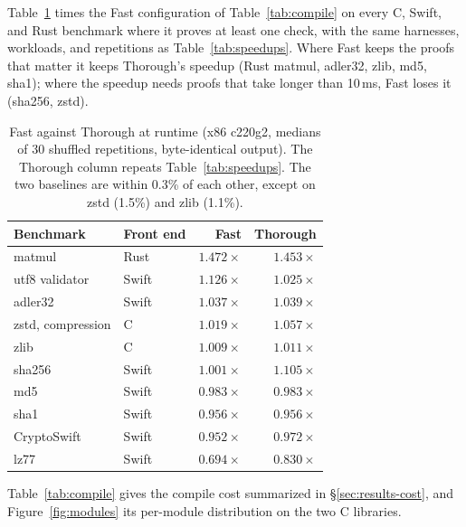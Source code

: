 \documentclass[acmsmall,screen,nonacm]{acmart}
\begin{document}
Table~\ref{tab:fast} times the Fast configuration of
Table~\ref{tab:compile} on every C, Swift, and Rust benchmark where it
proves at least one check, with the same harnesses, workloads, and
repetitions as Table~\ref{tab:speedups}. Where Fast keeps the proofs that
matter it keeps Thorough's speedup (Rust matmul, adler32, zlib, md5, sha1);
where the speedup needs proofs that take longer than 10\,ms, Fast loses it
(sha256, zstd).
\begin{table}[t]
\caption{Fast against Thorough at runtime (x86 c220g2, medians of 30
shuffled repetitions, byte-identical output).
The Thorough column repeats Table~\ref{tab:speedups}. The two baselines
are within 0.3\% of each other, except on zstd (1.5\%) and zlib (1.1\%).}
\label{tab:fast}
\small
\begin{tabular}{llrr}
\toprule
Benchmark & Front end & Fast & Thorough\\
\midrule
matmul & Rust & $1.472\times$ & $1.453\times$\\
utf8 validator & Swift & $1.126\times$ & $1.025\times$\\
adler32 & Swift & $1.037\times$ & $1.039\times$\\
zstd, compression & C & $1.019\times$ & $1.057\times$\\
zlib & C & $1.009\times$ & $1.011\times$\\
sha256 & Swift & $1.001\times$ & $1.105\times$\\
md5 & Swift & $0.983\times$ & $0.983\times$\\
sha1 & Swift & $0.956\times$ & $0.956\times$\\
CryptoSwift & Swift & $0.952\times$ & $0.972\times$\\
lz77 & Swift & $0.694\times$ & $0.830\times$\\
\bottomrule
\end{tabular}
\end{table}
Table~\ref{tab:compile} gives the compile cost summarized in
\S\ref{sec:results-cost}, and Figure~\ref{fig:modules} its per-module
distribution on the two C libraries.
\end{document}
